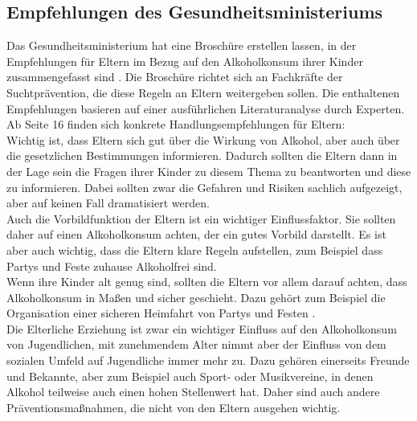 \documentclass[12pt]{article}
\begin{document}
\subsection{Empfehlungen des Gesundheitsministeriums}
Das Gesundheitsministerium hat eine Broschüre erstellen lassen, in der Empfehlungen für Eltern im Bezug auf den Alkoholkonsum ihrer Kinder zusammengefasst sind \autocite{kuhn_empfehlungen_nodate}. Die Broschüre richtet sich an Fachkräfte der Suchtprävention, die diese Regeln an Eltern weitergeben sollen. Die enthaltenen Empfehlungen basieren auf einer ausführlichen Literaturanalyse durch Experten. Ab Seite 16 finden sich konkrete Handlungsempfehlungen für Eltern:\\
Wichtig ist, dass Eltern sich gut über die Wirkung von Alkohol, aber auch über die gesetzlichen Bestimmungen informieren. Dadurch sollten die Eltern dann in der Lage sein die Fragen ihrer Kinder zu diesem Thema zu beantworten und diese zu informieren. Dabei sollten zwar die Gefahren und Risiken sachlich aufgezeigt, aber auf keinen Fall dramatisiert werden.\\
Auch die Vorbildfunktion der Eltern ist ein wichtiger Einflussfaktor. Sie sollten daher auf einen Alkoholkonsum achten, der ein gutes Vorbild darstellt. Es ist aber auch wichtig, dass die Eltern klare Regeln aufstellen, zum Beispiel dass Partys und Feste zuhause Alkoholfrei sind.\\
Wenn ihre Kinder alt genug sind, sollten die Eltern vor allem darauf achten, dass Alkoholkonsum in Maßen und sicher geschieht. Dazu gehört zum Beispiel die Organisation einer sicheren Heimfahrt von Partys und Festen \autocite[16-23]{kuhn_empfehlungen_nodate}.\\
Die Elterliche Erziehung ist zwar ein wichtiger Einfluss auf den Alkoholkonsum von Jugendlichen, mit zunehmendem Alter nimmt aber der Einfluss von dem sozialen Umfeld auf Jugendliche immer mehr zu. Dazu gehören einerseits Freunde und Bekannte, aber zum Beispiel auch Sport- oder Musikvereine, in denen Alkohol teilweise auch einen hohen Stellenwert hat. Daher sind auch andere Präventionsmaßnahmen, die nicht von den Eltern ausgehen wichtig.
\end{document}
